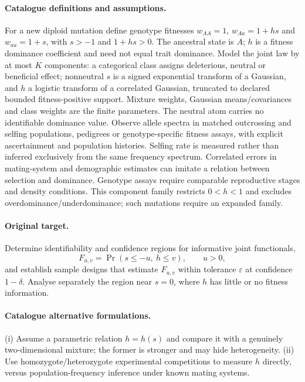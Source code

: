 \documentclass[11pt]{article}
\begin{document}
\paragraph{Catalogue definitions and assumptions.}
For a new diploid mutation define genotype fitnesses $w_{AA}=1$, $w_{Aa}=1+hs$ and $w_{aa}=1+s$, with $s>-1$ and $1+hs>0$. The ancestral state is $A$; $h$ is a fitness dominance coefficient and need not equal trait dominance. Model the joint law by at most $K$ components: a categorical class assigns deleterious, neutral or beneficial effect; nonneutral $s$ is a signed exponential transform of a Gaussian, and $h$ a logistic transform of a correlated Gaussian, truncated to declared bounded fitness-positive support. Mixture weights, Gaussian means/covariances and class weights are the finite parameters. The neutral atom carries no identifiable dominance value. Observe allele spectra in matched outcrossing and selfing populations, pedigrees or genotype-specific fitness assays, with explicit ascertainment and population histories. Selfing rate is measured rather than inferred exclusively from the same frequency spectrum. Correlated errors in mating-system and demographic estimates can imitate a relation between selection and dominance. Genotype assays require comparable reproductive stages and density conditions. This component family restricts $0<h<1$ and excludes overdominance/underdominance; such mutations require an expanded family.
\paragraph{Original target.}
Determine identifiability and confidence regions for informative joint functionals,
\[
 F_{u,v}=\Pr(s\le-u,\ h\le v),\qquad u>0,
\]
and establish sample designs that estimate $F_{u,v}$ within tolerance $\varepsilon$ at confidence $1-\delta$. Analyse separately the region near $s=0$, where $h$ has little or no fitness information.
\paragraph{Catalogue alternative formulations.}
(i) Assume a parametric relation $h=h(s)$ and compare it with a genuinely two-dimensional mixture; the former is stronger and may hide heterogeneity. (ii) Use homozygote/heterozygote experimental competitions to measure $h$ directly, versus population-frequency inference under known mating systems.
\end{document}
